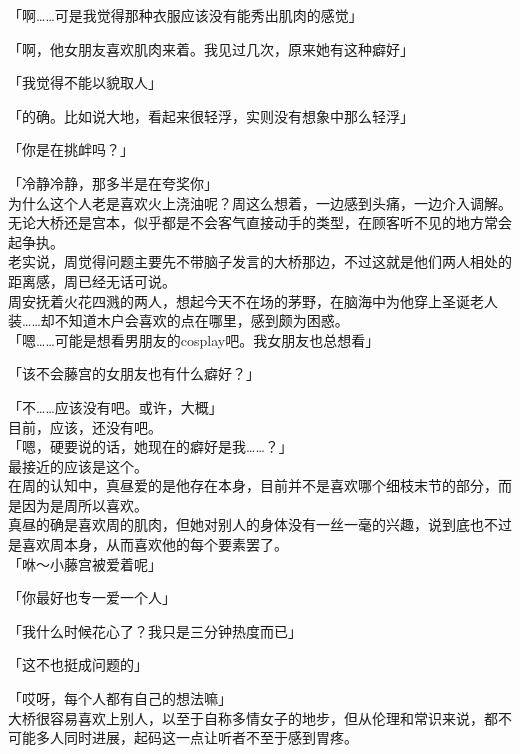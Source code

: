 「啊……可是我觉得那种衣服应该没有能秀出肌肉的感觉」

「啊，他女朋友喜欢肌肉来着。我见过几次，原来她有这种癖好」

「我觉得不能以貌取人」

「的确。比如说大地，看起来很轻浮，实则没有想象中那么轻浮」

「你是在挑衅吗？」

「冷静冷静，那多半是在夸奖你」\\

为什么这个人老是喜欢火上浇油呢？周这么想着，一边感到头痛，一边介入调解。无论大桥还是宫本，似乎都是不会客气直接动手的类型，在顾客听不见的地方常会起争执。\\

老实说，周觉得问题主要先不带脑子发言的大桥那边，不过这就是他们两人相处的距离感，周已经无话可说。\\

周安抚着火花四溅的两人，想起今天不在场的茅野，在脑海中为他穿上圣诞老人装……却不知道木户会喜欢的点在哪里，感到颇为困惑。\\

「嗯……可能是想看男朋友的cosplay吧。我女朋友也总想看」

「该不会藤宫的女朋友也有什么癖好？」

「不……应该没有吧。或许，大概」\\

目前，应该，还没有吧。\\

「嗯，硬要说的话，她现在的癖好是我……？」\\

最接近的应该是这个。\\

在周的认知中，真昼爱的是他存在本身，目前并不是喜欢哪个细枝末节的部分，而是因为是周所以喜欢。\\

真昼的确是喜欢周的肌肉，但她对别人的身体没有一丝一毫的兴趣，说到底也不过是喜欢周本身，从而喜欢他的每个要素罢了。\\

「咻～小藤宫被爱着呢」

「你最好也专一爱一个人」

「我什么时候花心了？我只是三分钟热度而已」

「这不也挺成问题的」

「哎呀，每个人都有自己的想法嘛」\\

大桥很容易喜欢上别人，以至于自称多情女子的地步，但从伦理和常识来说，都不可能多人同时进展，起码这一点让听者不至于感到胃疼。

